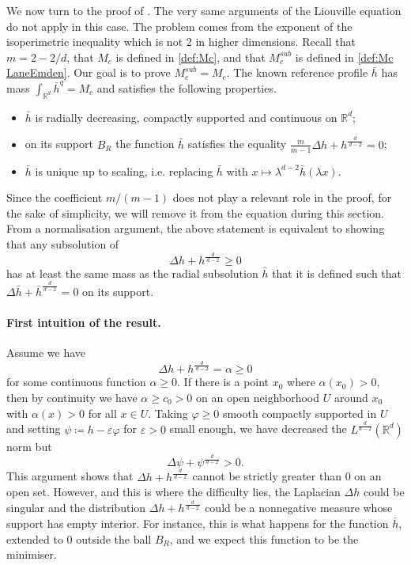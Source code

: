 \documentclass[11pt,a4paper]{article}
\numberwithin{equation}{section}
\newcommand{\R}{{\mathbb{R}}}
\theoremstyle{plain}
\theoremstyle{remark}
\newcommand {\f}{\frac}
\begin{document}
We now turn to the proof of . The very same arguments of the Liouville equation do not apply in this case. The problem comes from the exponent of the isoperimetric inequality which is not 2 in higher dimensions. 
Recall that $m=2-2/d$, that $M_c$ is defined in \eqref{def:Mc},
and that $M_c^{sub}$ is defined in \eqref{def:Mc LaneEmden}.
Our goal is to prove $M_c^{sub}=M_c$. The known reference profile
$\bar h$ has mass $\int_{\R^d}\bar h^q=M_c$ and satisfies the
following properties.
\begin{itemize}
\item $\bar h$ is radially decreasing, compactly supported and continuous on $\R^d$;
\item on its support $B_R$ the function $\bar h$ satisfies the equality $\f{m}{m-1}\Delta h + h^{\frac{d}{\,d-2\,}}  =  0$;
\item $\bar h$ is unique up to scaling, i.e. replacing $\bar h$ with $x\mapsto \lambda^{d-2}\bar h (\lambda x)$.
\end{itemize}
Since the coefficient $m/(m-1)$ does not play a relevant role in the proof, for the sake of simplicity, we will remove it from the equation during this section. 
From a normalisation argument, the above statement is equivalent to showing that any subsolution of 
$$
    \Delta h + h^{\frac{d}{\,d-2\,}}  \ge  0
$$
has at least the same mass as the radial subsolution $\bar{h}$ that it is defined such that  $\Delta \bar{h} + \bar{h}^{\frac{d}{\,d-2\,}}  = 0$ on its support.


\paragraph{First intuition of the result.} Assume  we have
\begin{equation}\label{intuition alpha}
    \Delta h + h^{\frac{d}{\,d-2\,}}  = \alpha  \ge  0
\end{equation}
for some continuous function $\alpha\ge 0$. If there is a point $x_0$ where $\alpha(x_0) > 0$, then by continuity we have $\alpha\geq c_0>0$ on an open neighborhood $U$ around $x_0$ with $\alpha(x)>0$ for all $x \in U$. Taking $\varphi\ge 0$ smooth compactly supported in $U$ and setting $\psi \coloneqq h - \varepsilon \varphi$ for $\varepsilon>0$ small enough, we have decreased the $L^\f{d}{d-2}(\R^d)$ norm but
\[
    \Delta \psi + \psi^{\frac{d}{\,d-2\,}}   >  0.
\]
 This argument shows that $\Delta h + h^{\f{d}{\,d-2\,}}$ cannot be strictly greater than 0 on an open set. However, and this is where the difficulty lies, the Laplacian $\Delta h$ could be singular and the distribution  $\Delta h + h^{\f{d}{\,d-2\,}}$ could be a nonnegative measure whose support has empty interior. For instance, this is what happens for the function $\bar h$, extended to $0$ outside the ball $B_R$, and we expect this function to be the minimiser.
\end{document}
